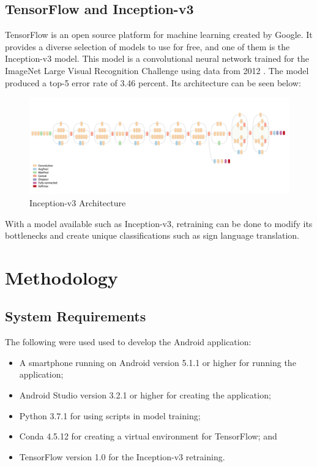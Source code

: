 \documentclass[journal]{./IEEE/IEEEtran}
\begin{document}
\subsection{TensorFlow and Inception-v3}
TensorFlow is an open source platform for machine learning created by Google. It provides a diverse selection of models to use for free, and one of them is the Inception-v3 model. This model is a convolutional neural network trained for the ImageNet Large Visual Recognition Challenge using data from 2012 \cite{Szegedy2014}.
\newline
\indent The model produced a top-5 error rate of 3.46 percent. Its architecture can be seen below:

\begin{figure}[ht!]
    \centering
    \includegraphics[width=1\linewidth]{./images/inception.png}
    \caption{Inception-v3 Architecture}
    \label{fig:inception}
\end{figure}

\indent With a model available such as Inception-v3, retraining can be done to modify its bottlenecks and create unique classifications such as sign language translation.

\section{Methodology}

\subsection{System Requirements}
The following were used used to develop the Android application:

\begin{itemize}
    \item A smartphone running on Android version 5.1.1 or higher for running the application;
    \item Android Studio version 3.2.1 or higher for creating the application;
    \item Python 3.7.1 for using scripts in model training;
    \item Conda 4.5.12 for creating a virtual environment for TensorFlow; and
    \item TensorFlow version 1.0 for the Inception-v3 retraining.
\end{itemize}
\end{document}
